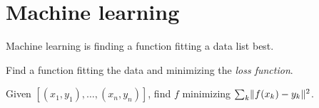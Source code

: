 \chapter{Machine learning}

Machine learning is finding a function
fitting a data list best.

Find a function fitting the data and minimizing the
%
\emph{loss function}.

Given \([(x_1,y_1),\ldots,(x_n,y_n)]\),
find \(f\) minimizing \(\sum_k \lVert f(x_k) - y_k\rVert^2\).
